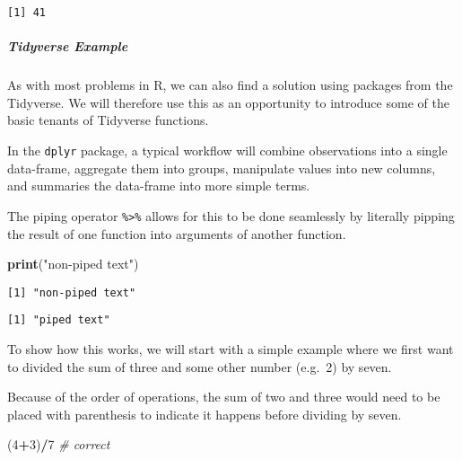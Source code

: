 \documentclass[12pt,]{article}
\newenvironment{Shaded}{\begin{snugshade}}{\end{snugshade}}
\newcommand{\KeywordTok}[1]{\textcolor[rgb]{0.13,0.29,0.53}{\textbf{#1}}}
\newcommand{\DecValTok}[1]{\textcolor[rgb]{0.00,0.00,0.81}{#1}}
\newcommand{\StringTok}[1]{\textcolor[rgb]{0.31,0.60,0.02}{#1}}
\newcommand{\CommentTok}[1]{\textcolor[rgb]{0.56,0.35,0.01}{\textit{#1}}}
\newcommand{\OperatorTok}[1]{\textcolor[rgb]{0.81,0.36,0.00}{\textbf{#1}}}
\newcommand{\NormalTok}[1]{#1}
\let\oldsubparagraph\subparagraph
\renewcommand{\subparagraph}[1]{\oldsubparagraph{#1}\mbox{}}
\theoremstyle{definition}
\theoremstyle{definition}
\theoremstyle{definition}
\theoremstyle{remark}
\begin{document}
\begin{verbatim}
[1] 41
\end{verbatim}

\subparagraph{Tidyverse Example}\label{tidyverse-example}

As with most problems in R, we can also find a solution using packages
from the Tidyverse. We will therefore use this as an opportunity to
introduce some of the basic tenants of Tidyverse functions.

In the \texttt{dplyr} package, a typical workflow will combine
observations into a single data-frame, aggregate them into groups,
manipulate values into new columns, and summaries the data-frame into
more simple terms.

The piping operator \texttt{\%\textgreater{}\%} allows for this to be
done seamlessly by literally pipping the result of one function into
arguments of another function.

\begin{Shaded}
\begin{Highlighting}[]
\KeywordTok{print}\NormalTok{(}\StringTok{"non-piped text"}\NormalTok{)}
\end{Highlighting}
\end{Shaded}

\begin{verbatim}
[1] "non-piped text"
\end{verbatim}

\begin{Shaded}
\end{Shaded}

\begin{verbatim}
[1] "piped text"
\end{verbatim}

To show how this works, we will start with a simple example where we
first want to divided the sum of three and some other number (e.g.~2) by
seven.

Because of the order of operations, the sum of two and three would need
to be placed with parenthesis to indicate it happens before dividing by
seven.

\begin{Shaded}
\begin{Highlighting}[]
\NormalTok{(}\DecValTok{4}\OperatorTok{+}\DecValTok{3}\NormalTok{)}\OperatorTok{/}\DecValTok{7} \CommentTok{# correct}
\end{Highlighting}
\end{Shaded}
\end{document}
